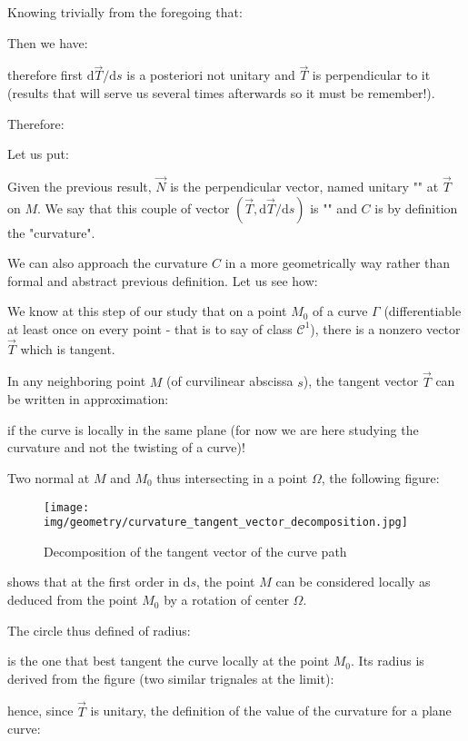 {	Knowing trivially from the foregoing that:
	
	Then we have:
	
	therefore first $\mathrm{d}\vec{T}/\mathrm{d}s$ is a posteriori not unitary and $\vec{T}$ is perpendicular to it (results that will serve us several times afterwards so it must be remember!).
	
	Therefore:
	
	
	Let us put:
	
	Given the previous result, $\vec{N}$ is the perpendicular vector, named unitary "" at $\vec{T}$ on $M$. We say that this couple of vector $\left(\vec{T},\mathrm{d}\vec{T}/\mathrm{d}s\right)$ is "" and $C$ is by definition the "curvature".
	
	We can also approach the curvature $C$ in a more geometrically way rather than formal and abstract previous definition. Let us see how:
	
	We know at this step of our study that on a point $M_0$ of a curve $\Gamma$ (differentiable at least once on every point - that is to say of class $\mathcal{C}^1$), there is a nonzero vector $\vec{T}$ which is tangent.
	
	In any neighboring point $M$ (of curvilinear abscissa $s$), the tangent vector $\vec{T}$ can be written in approximation:
	
	if the curve is locally in the same plane (for now we are here studying the curvature and not the twisting of a curve)!
	
	Two normal at $M$ and $M_0$ thus intersecting in a point $\Omega$, the following figure:
	\begin{figure}[H]
		\centering
		\texttt{[image: img/geometry/curvature\_tangent\_vector\_decomposition.jpg]}
		\caption{Decomposition of the tangent vector of the curve path}
	\end{figure}
	shows that at the first order in $\mathrm{d}s$, the point $M$ can be considered locally as deduced from the point $M_0$ by a rotation of center $\Omega$.
	
	The circle thus defined of radius:
	
	is the one that best tangent the curve locally at the point $M_0$. Its radius is derived from the figure (two similar trignales at the limit):
	
	hence, since $\vec{T}$ is unitary, the definition of the value of the curvature for a plane curve:
	
}

